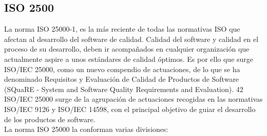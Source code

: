 \documentclass[preprint,12pt]{elsarticle}
\begin{document}
	\subsection{\textbf{ISO 2500}}
	La norma ISO 25000-1, es la más reciente de todas las normativas ISO que afectan al desarrollo del software de calidad. Calidad del software y calidad en el proceso de su desarrollo, deben ir acompañados en cualquier organización que actualmente aspire a unos estándares de calidad óptimos. Es por ello que surge ISO/IEC 25000, como un nuevo compendio de actuaciones, de lo que se ha denominado Requisitos y Evaluación de Calidad de Productos de Software (SQuaRE - System and Software Quality Requirements and Evaluation). 42 ISO/IEC 25000 surge de la agrupación de actuaciones recogidas en las normativas ISO/IEC 9126 y ISO/IEC 14598, con el principal objetivo de guiar el desarrollo de los productos de software.
\\
La norma ISO 25000 la conforman varias divisiones: 
\end{document}
